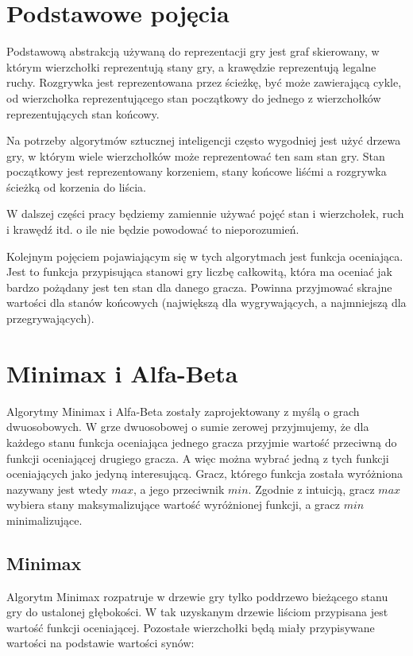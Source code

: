\documentclass{pracamgr}
\begin{document}
\section{Podstawowe pojęcia}

Podstawową abstrakcją używaną do reprezentacji gry jest graf skierowany, w którym wierzchołki reprezentują stany gry, a krawędzie reprezentują legalne ruchy. Rozgrywka jest reprezentowana przez ścieżkę, być może zawierającą cykle, od wierzchołka reprezentującego stan początkowy do jednego z wierzchołków reprezentujących stan końcowy.

Na potrzeby algorytmów sztucznej inteligencji często wygodniej jest użyć drzewa gry, w którym wiele wierzchołków może reprezentować ten sam stan gry. Stan początkowy jest reprezentowany korzeniem, stany końcowe liśćmi a rozgrywka ścieżką od korzenia do liścia.

W dalszej części pracy będziemy zamiennie używać pojęć stan i wierzchołek, ruch i krawędź itd. o ile nie będzie powodować to nieporozumień.

Kolejnym pojęciem pojawiającym się w tych algorytmach jest funkcja oceniająca.
Jest to funkcja przypisująca stanowi gry liczbę całkowitą, która ma oceniać jak bardzo pożądany jest ten stan dla danego gracza.
Powinna przyjmować skrajne wartości dla stanów końcowych (największą dla wygrywających, a najmniejszą dla przegrywających).

\section{Minimax i Alfa-Beta}

Algorytmy Minimax i Alfa-Beta zostały zaprojektowany z myślą o grach dwuosobowych.
W grze dwuosobowej o sumie zerowej przyjmujemy, że dla każdego stanu funkcja oceniająca jednego gracza przyjmie wartość przeciwną do funkcji oceniającej drugiego gracza.
A więc można wybrać jedną z tych funkcji oceniających jako jedyną interesującą.
Gracz, którego funkcja została wyróżniona nazywany jest wtedy \(max\), a jego przeciwnik \(min\).
Zgodnie z intuicją, gracz \(max\) wybiera stany maksymalizujące wartość wyróżnionej funkcji, a gracz \(min\) minimalizujące.

\subsection{Minimax}

Algorytm Minimax rozpatruje w drzewie gry tylko poddrzewo bieżącego stanu gry do ustalonej głębokości. W tak uzyskanym drzewie liściom przypisana jest wartość funkcji oceniającej. Pozostałe wierzchołki będą miały przypisywane wartości na podstawie wartości synów:
\end{document}
